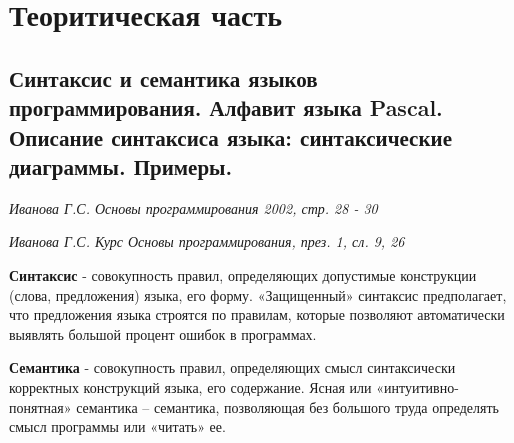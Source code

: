 


\newcommand{\hbook}[1]{{\begin{center}\textit{Иванова Г.С. Основы программирования 2002, стр. #1}\end{center}}}
\newcommand{\hprez}[2]{\begin{center}\textit{Иванова Г.С. Курс Основы программирования, през. #1, сл. #2}\end{center}}


% 
\toc

\section{Теоритическая часть}


\subsection{Синтаксис  и  семантика  языков  программирования.  Алфавит  языка  Pascal.  Описание синтаксиса языка: синтаксические диаграммы. Примеры. }

\begin{myquote}
\hbook{28 - 30}

\hprez{1}{9, 26}
\end{myquote}
\large
{\bf{Синтаксис}}
 - совокупность правил, определяющих допустимые конструкции (слова, предложения) языка, его форму. «Защищенный» синтаксис предполагает, что предложения языка строятся по правилам, которые позволяют автоматически выявлять большой процент ошибок в программах.

{\bf{Семантика}}
 - совокупность правил, определяющих смысл синтаксически корректных конструкций языка, его содержание. Ясная или «интуитивно-понятная» семантика – семантика, позволяющая без большого труда определять смысл программы или «читать» ее.

